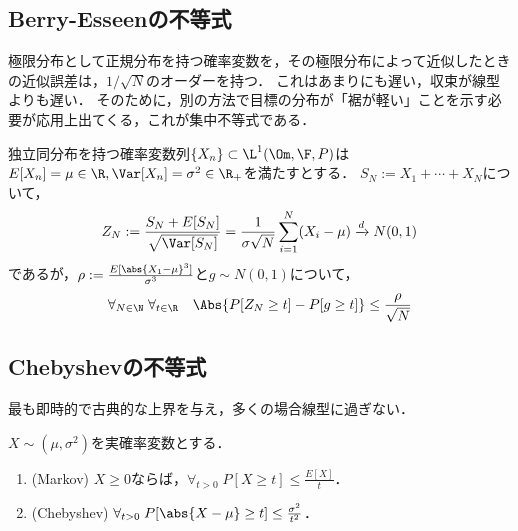 \documentclass[uplatex,dvipdfmx]{jsreport}
\begin{document}
\subsection{Berry-Esseenの不等式}

\begin{tcolorbox}[colframe=ForestGreen, colback=ForestGreen!10!white,breakable,colbacktitle=ForestGreen!40!white,coltitle=black,fonttitle=\bfseries\sffamily,
title=中心極限定理の誤差の評価]
    極限分布として正規分布を持つ確率変数を，その極限分布によって近似したときの近似誤差は，$1/\sqrt{N}$のオーダーを持つ．
    これはあまりにも遅い，収束が線型よりも遅い．
    そのために，別の方法で目標の分布が「裾が軽い」ことを示す必要が応用上出てくる，これが集中不等式である．
\end{tcolorbox}

\begin{theorem}\label{thm-Berry-Esseen}
    独立同分布を持つ確率変数列$\{X_n\}\subset\L^1(\Om,\F,P)$は$E[X_n]=\mu\in\R,\Var[X_n]=\sigma^2\in\R_+$を満たすとする．
    $S_N:=X_1+\cdots+X_N$について，
    \[Z_N:=\frac{S_N+E[S_N]}{\sqrt{\Var[S_N]}}=\frac{1}{\sigma\sqrt{N}}\sum^N_{i=1}(X_i-\mu)\xrightarrow{d}N(0,1)\]
    であるが，$\rho:=\frac{E[\abs{X_1-\mu}^3]}{\sigma^3}$と$g\sim N(0,1)$について，
    \[\forall_{N\in\N}\;\forall_{t\in\R}\quad\Abs{P[Z_N\ge t]-P[g\ge t]}\le\frac{\rho}{\sqrt{N}}\]
\end{theorem}

\subsection{Chebyshevの不等式}

\begin{tcolorbox}[colframe=ForestGreen, colback=ForestGreen!10!white,breakable,colbacktitle=ForestGreen!40!white,coltitle=black,fonttitle=\bfseries\sffamily,
title=]
    最も即時的で古典的な上界を与え，多くの場合線型に過ぎない．
\end{tcolorbox}

\begin{theorem}
    $X\sim(\mu,\sigma^2)$を実確率変数とする．
    \begin{enumerate}
        \item (Markov) $X\ge0$ならば，$\forall_{t>0}\;P[X\ge t]\le\frac{E[X]}{t}$．
        \item (Chebyshev) $\forall_{t>0}\;P[\abs{X-\mu}\ge t]\le\frac{\sigma^2}{t^2}$．
    \end{enumerate}
\end{theorem}
\end{document}

